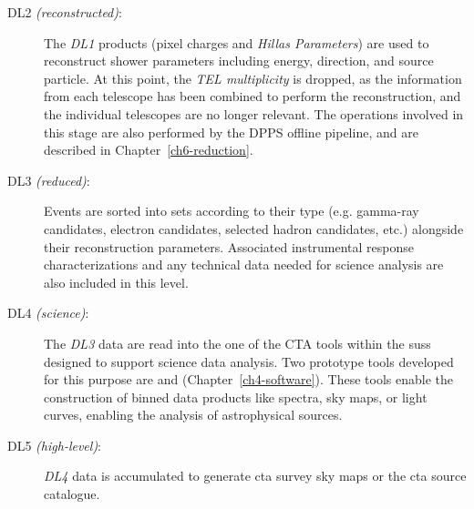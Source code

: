 \begin{description}
\item[DL2 \textit{(reconstructed)}:]
The \textit{DL1} products (pixel charges and \textit{Hillas Parameters}) are used to reconstruct shower parameters including energy, direction, and source particle. At this point, the \textit{TEL multiplicity} is dropped, as the information from each telescope has been combined to perform the reconstruction, and the individual telescopes are no longer relevant. The operations involved in this stage are also performed by the DPPS offline pipeline, and are described in Chapter~\ref{ch6-reduction}.
\item[DL3 \textit{(reduced)}:]
Events are sorted into sets according to their type (e.g. gamma-ray candidates, electron candidates, selected hadron
candidates, etc.) alongside their reconstruction parameters. Associated instrumental response characterizations and any technical data needed for
science analysis are also included in this level.
\item[DL4 \textit{(science)}:]
The \textit{DL3} data are read into the one of the CTA tools within the \gls{suss} designed to support science data analysis. Two prototype tools developed for this purpose are  and  (Chapter~\ref{ch4-software}). These tools enable the construction of binned data products like spectra, sky maps, or light curves, enabling the analysis of astrophysical sources.
\item[DL5 \textit{(high-level)}:]
\textit{DL4} data is accumulated to generate \gls{cta} survey sky maps or the \gls{cta}
source catalogue.
\end{description}
